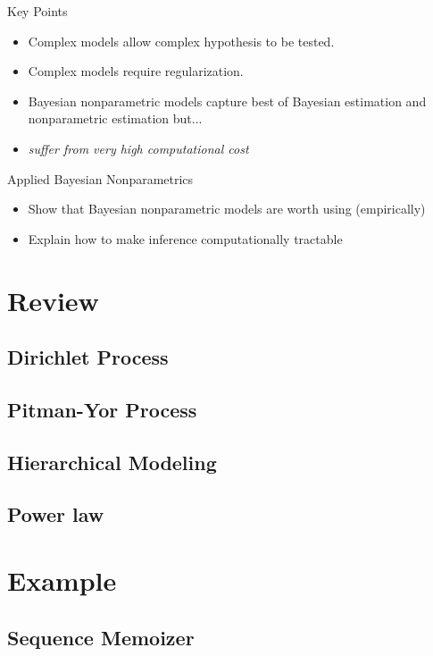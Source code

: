 \documentclass{beamer}
\begin{document}
\begin{frame}[t]{Key Points}
\begin{itemize}
\item Complex models allow complex hypothesis to be tested.
\item Complex models require regularization.
\item Bayesian nonparametric models capture best of Bayesian estimation and nonparametric estimation but...
\item {\em suffer from very high computational cost}
\end{itemize}
\end{frame}	

\begin{frame}[t]{Applied Bayesian Nonparametrics}
\begin{itemize}
\item Show that Bayesian nonparametric models are worth using (empirically)
\item Explain how to make inference computationally tractable
\end{itemize}
\end{frame}	

\section{Review}
\subsection{Dirichlet Process}

\subsection{Pitman-Yor Process}

\subsection{Hierarchical Modeling}
\subsection{Power law}

\section{Example}
\subsection{Sequence Memoizer}
\end{document}

